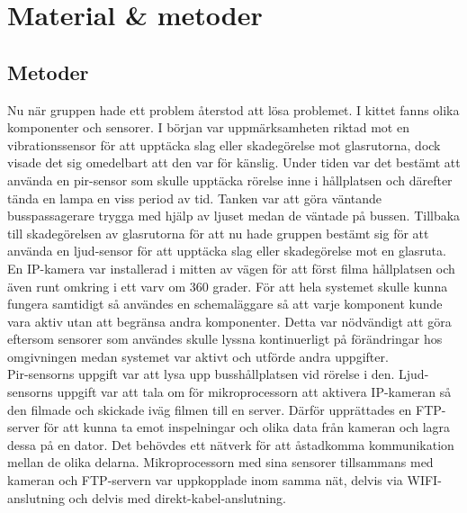 



\chapter{Material \& metoder} %
\label{ch:metoder}


\ifpdf
    \graphicspath{{8/figures/PNG/}{8/figures/PDF/}{8/figures/}}
\else
    \graphicspath{{8/figures/EPS/}{8/figures/}}
\fi




\section{Metoder}
Nu när gruppen hade ett problem återstod att lösa problemet. I kittet fanns olika komponenter och sensorer. I början var uppmärksamheten riktad mot en vibrationssensor för att upptäcka slag eller skadegörelse mot glasrutorna, dock visade det sig omedelbart att den var för känslig. Under tiden var det bestämt att använda en pir-sensor som skulle upptäcka rörelse inne i hållplatsen och därefter tända en lampa en viss period av tid. Tanken var att göra väntande busspassagerare trygga med hjälp av ljuset medan de väntade på bussen. Tillbaka till skadegörelsen av glasrutorna för att nu hade gruppen bestämt sig för att använda en ljud-sensor för att upptäcka slag eller skadegörelse mot en glasruta. En IP-kamera var installerad i mitten av vägen för att först filma hållplatsen och även runt omkring i ett varv om 360 grader. 
För att hela systemet skulle kunna fungera samtidigt så användes en schemaläggare så att varje komponent kunde vara aktiv utan att begränsa andra komponenter. Detta var nödvändigt att göra eftersom sensorer som användes skulle lyssna kontinuerligt på förändringar hos omgivningen medan systemet var aktivt och utförde andra uppgifter.\\

Pir-sensorns uppgift var att lysa upp busshållplatsen vid rörelse i den. Ljud-sensorns uppgift var att tala om för mikroprocessorn att aktivera IP-kameran så den filmade och skickade iväg filmen till en server. Därför upprättades en FTP-server för att kunna ta emot inspelningar och olika data från kameran och lagra dessa på en dator. Det behövdes ett nätverk för att åstadkomma kommunikation mellan de olika delarna. Mikroprocessorn med sina sensorer tillsammans med kameran och FTP-servern var uppkopplade inom samma nät, delvis via WIFI-anslutning och delvis med direkt-kabel-anslutning.\\


